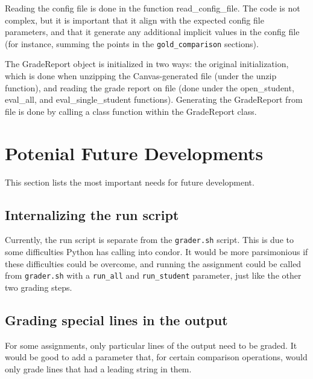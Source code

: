 \documentclass[12pt]{article}
\begin{document}
Reading the config file is done in the function read\_config\_file. The code is not complex, but it is important that it align with the expected config file parameters, and that it generate any additional implicit values in the config file (for instance, summing the points in the \texttt{gold\_comparison} sections).

The GradeReport object is initialized in two ways: the original initialization, which is done when unzipping the Canvas-generated file (under the unzip function), and reading the grade report on file (done under the open\_student, eval\_all, and eval\_single\_student functions). Generating the GradeReport from file is done by calling a class function within the GradeReport class.

\section{Potenial Future Developments} \label{sec:future}

This section lists the most important needs for future development.

\subsection{Internalizing the run script} \label{sec:internalrun}

Currently, the run script is separate from the \texttt{grader.sh} script. This is due to some difficulties Python has calling into condor. It would be more parsimonious if these difficulties could be overcome, and running the assignment could be called from \texttt{grader.sh} with a \texttt{run\_all} and \texttt{run\_student} parameter, just like the other two grading steps.

\subsection{Grading special lines in the output} \label{sec:speciallines}

For some assignments, only particular lines of the output need to be graded. It would be good to add a parameter that, for certain comparison operations, would only grade lines that had a leading string in them.
\end{document}
